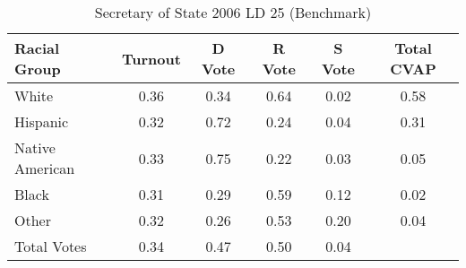 \begin{table}[htb]
\begin{center}
\caption{Secretary of State 2006 LD 25 (Benchmark)}
\label{sos06_cvap_ld_25_benchmark}
\begin{tabular}{lccccc}
  \hline
Racial Group & Turnout & D Vote & R Vote & S Vote & Total CVAP \\ 
  \hline
White & 0.36 & 0.34 & 0.64 & 0.02 & 0.58 \\ 
  Hispanic & 0.32 & 0.72 & 0.24 & 0.04 & 0.31 \\ 
  Native American & 0.33 & 0.75 & 0.22 & 0.03 & 0.05 \\ 
  Black & 0.31 & 0.29 & 0.59 & 0.12 & 0.02 \\ 
  Other & 0.32 & 0.26 & 0.53 & 0.20 & 0.04 \\ 
  Total Votes & 0.34 & 0.47 & 0.50 & 0.04 &  \\ 
   \hline
\end{tabular}
\end{center}
\end{table}

